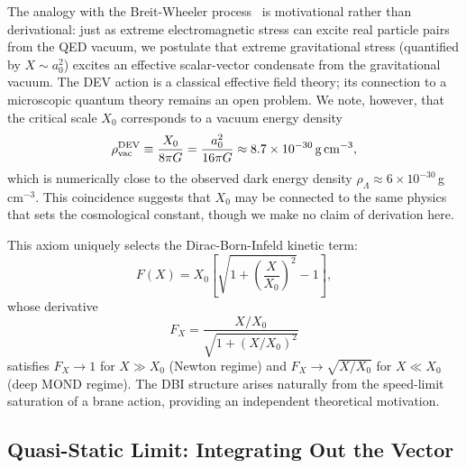\documentclass[aps,prd,twocolumn,showpacs,superscriptaddress]{revtex4-2}
\newcommand{\aO}{a_0}
\newcommand{\Xzero}{X_0}
\begin{document}
The analogy with the Breit-Wheeler process~\cite{BreitWheeler1934}
is motivational rather than derivational: just as extreme
electromagnetic stress can excite real particle pairs from
the QED vacuum, we postulate that extreme gravitational stress
(quantified by $X \sim \aO^2$) excites an effective
scalar-vector condensate from the gravitational vacuum.
The DEV action is a classical effective field theory;
its connection to a microscopic quantum theory remains
an open problem.
We note, however, that the critical scale $\Xzero$
corresponds to a vacuum energy density
\begin{equation}
  \rho_{\rm vac}^{\rm DEV}
  \equiv \frac{\Xzero}{8\pi G}
  = \frac{\aO^2}{16\pi G}
  \approx 8.7 \times 10^{-30}\,{\rm g\,cm^{-3}},
  \label{eq:rhovac}
\end{equation}
which is numerically close to the observed dark energy
density $\rho_\Lambda \approx 6\times10^{-30}$\,g\,cm$^{-3}$.
This coincidence suggests that $\Xzero$ may be
connected to the same physics that sets the cosmological
constant, though we make no claim of derivation here.

This axiom uniquely selects the Dirac-Born-Infeld kinetic term:
\begin{equation}
  F(X) = \Xzero\!\left[\sqrt{1 + \left(\frac{X}{\Xzero}\right)^{\!2}} - 1\right],
  \label{eq:DBI}
\end{equation}
whose derivative
\begin{equation}
  F_X = \frac{X/\Xzero}{\sqrt{1+(X/\Xzero)^2}}
  \label{eq:FX}
\end{equation}
satisfies $F_X \to 1$ for $X \gg \Xzero$ (Newton regime) and
$F_X \to \sqrt{X/\Xzero}$ for $X \ll \Xzero$ (deep MOND regime).
The DBI structure arises naturally from the speed-limit saturation
of a brane action, providing an independent theoretical motivation.

\subsection{Quasi-Static Limit: Integrating Out the Vector}
\end{document}
